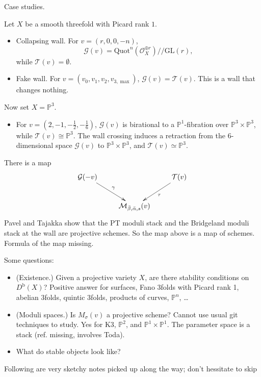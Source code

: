 \medskip\noindent
Case studies.

\noindent
Let $X$ be a smooth threefold with
Picard rank $1$.
\begin{itemize}
\item Collapsing wall.
For
$v=(r,0,0,-n)$,
$$
\mathcal{G}(v)=
\mathrm{Quot}^n(
\mathcal{O}_X^{\oplus r})/\!/
\mathrm{GL}(r),
$$
while $\mathcal{T}(v)=\emptyset$.
\item Fake wall.
For $v=(v_0,v_1,v_2,v_{3,\max})$,
$\mathcal{G}(v)=\mathcal{T}(v)$.
This is a wall that changes nothing.
\end{itemize}

\noindent
Now set $X=\mathbb{P}^3$.
\begin{itemize}
\item For
$v=(2,-1,-\tfrac{1}{2},-\tfrac{1}{6})$,
$\mathcal{G}(v)$ is birational to a
$\mathbb{P}^1$-fibration over
$\mathbb{P}^3\times\mathbb{P}^3$,
while $\mathcal{T}(v)\cong\mathbb{P}^3$.
The wall crossing induces a
retraction from the $6$-dimensional
space $\mathcal{G}(v)$ to
$\mathbb{P}^3\times\mathbb{P}^3$,
and
$\mathcal{T}(v)\simeq \mathbb{P}^3$.
\end{itemize}

\medskip\noindent
There is a map
$$
\xymatrix{
\mathcal{G}(-v)\ar[dr]^\gamma
&&
\mathcal{T}(v)\ar[dl]^\tau
\\
&
\mathcal{M}_{\bar\beta,\bar\alpha,s}(v)
&
}
$$
Pavel and Tajakka show that
the PT moduli stack and the
Bridgeland moduli stack at the wall
are projective schemes.
So the map above is a map of
schemes.
\noindent
Formula of the map missing.

\medskip\noindent
Some questions:
\begin{itemize}
\item (Existence.) Given a projective
variety $X$, are there stability
conditions on $D^\text{b}(X)$?
Positive answer for surfaces,
Fano 3folds with Picard rank 1,
abelian 3folds, quintic 3folds,
products of curves, $\mathbb{P}^n$,
\dots
\item (Moduli spaces.) Is
$M_\sigma(v)$ a projective scheme?
Cannot use usual git techniques to
study. Yes for K3, $\mathbb{P}^2$,
and $\mathbb{P}^1\times \mathbb{P}^1$.
The parameter space is a stack
(ref. missing, involves Toda).
\item What do stable objects
look like?
\end{itemize}

\medskip\noindent
\medskip\noindent
Following are very sketchy notes picked
up along the way; don't hessitate to skip

